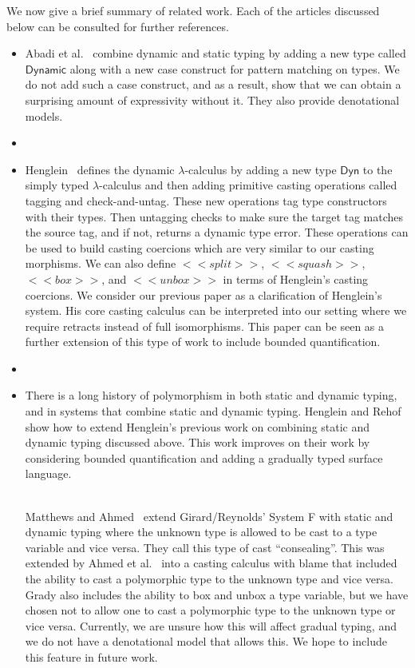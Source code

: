 We now give a brief summary of related work. Each of the articles
discussed below can be consulted for further references.
\begin{itemize}
\item Abadi et al.~\cite{Abadi:1989} combine dynamic and static typing
  by adding a new type called $\mathsf{Dynamic}$ along with a new case
  construct for pattern matching on types.  We do not add such a case
  construct, and as a result, show that we can obtain a surprising
  amount of expressivity without it.  They also provide denotational
  models.
\item[]
\item Henglein~\cite{Henglein:1994} defines the dynamic
  $\lambda$-calculus by adding a new type $\mathsf{Dyn}$ to the simply
  typed $\lambda$-calculus and then adding primitive casting
  operations called tagging and check-and-untag.  These new operations
  tag type constructors with their types.  Then untagging checks to
  make sure the target tag matches the source tag, and if not, returns
  a dynamic type error.  These operations can be used to build casting
  coercions which are very similar to our casting morphisms. We can
  also define $<<split>>$, $<<squash>>$, $<<box>>$, and $<<unbox>>$ in
  terms of Henglein's casting coercions.  We consider our previous
  paper \cite{Eades:2017} as a clarification of Henglein's system.
  His core casting calculus can be interpreted into our setting where
  we require retracts instead of full isomorphisms.  This paper can be
  seen as a further extension of this type of work to include bounded
  quantification.
\item[]
\item There is a long history of polymorphism in both static and
  dynamic typing, and in systems that combine static and dynamic
  typing. Henglein and Rehof~\cite{Henglein:1995,Rehof:1995} show how
  to extend Henglein's previous work on combining static and dynamic
  typing discussed above.  This work improves on their work by
  considering bounded quantification and adding a gradually typed
  surface language.

  \ \\ Matthews and Ahmed~\cite{Matthews:2008:PPT:1792878.1792881}
  extend Girard/Reynolds' System F with static and dynamic typing
  where the unknown type is allowed to be cast to a type variable and
  vice versa.  They call this type of cast ``consealing''.  This was
  extended by Ahmed et al.~\cite{Ahmed:2011:BLA:1926385.1926409} into
  a casting calculus with blame that included the ability to cast a
  polymorphic type to the unknown type and vice versa.  Grady also
  includes the ability to box and unbox a type variable, but we have
  chosen not to allow one to cast a polymorphic type to the unknown
  type or vice versa. Currently, we are unsure how this will affect
  gradual typing, and we do not have a denotational model that allows
  this.  We hope to include this feature in future work.


\end{itemize}
